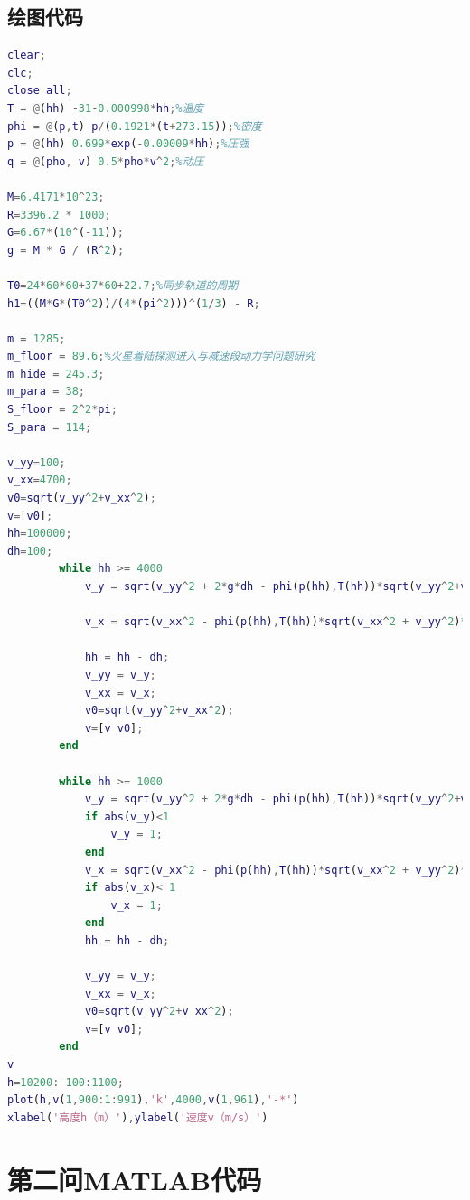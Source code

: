 \documentclass[hyperref,a4paper,UTF8]{ctexart}
\begin{document}
\subsection{绘图代码}
\begin{lstlisting}[language=Matlab]
clear;
clc;
close all;
T = @(hh) -31-0.000998*hh;%温度
phi = @(p,t) p/(0.1921*(t+273.15));%密度
p = @(hh) 0.699*exp(-0.00009*hh);%压强
q = @(pho, v) 0.5*pho*v^2;%动压

M=6.4171*10^23;
R=3396.2 * 1000;
G=6.67*(10^(-11));
g = M * G / (R^2);

T0=24*60*60+37*60+22.7;%同步轨道的周期
h1=((M*G*(T0^2))/(4*(pi^2)))^(1/3) - R;

m = 1285;
m_floor = 89.6;%火星着陆探测进入与减速段动力学问题研究
m_hide = 245.3;
m_para = 38;
S_floor = 2^2*pi;
S_para = 114;

v_yy=100;
v_xx=4700;
v0=sqrt(v_yy^2+v_xx^2);
v=[v0];
hh=100000;
dh=100;
        while hh >= 4000
            v_y = sqrt(v_yy^2 + 2*g*dh - phi(p(hh),T(hh))*sqrt(v_yy^2+v_xx^2)*S_floor*dh*v_yy/m);
            
            v_x = sqrt(v_xx^2 - phi(p(hh),T(hh))*sqrt(v_xx^2 + v_yy^2)*S_floor*dh*v_xx^2 / (m * v_yy));
            
            hh = hh - dh;
            v_yy = v_y;
            v_xx = v_x;
            v0=sqrt(v_yy^2+v_xx^2);
            v=[v v0];
        end

        while hh >= 1000
            v_y = sqrt(v_yy^2 + 2*g*dh - phi(p(hh),T(hh))*sqrt(v_yy^2+v_xx^2)*(S_floor+S_para)*dh*v_yy/m);
            if abs(v_y)<1  
                v_y = 1;
            end
            v_x = sqrt(v_xx^2 - phi(p(hh),T(hh))*sqrt(v_xx^2 + v_yy^2)*(S_floor+S_para)*dh*v_xx^2 / (m * v_yy));
            if abs(v_x)< 1
                v_x = 1;
            end
            hh = hh - dh;
            
            v_yy = v_y;
            v_xx = v_x;
            v0=sqrt(v_yy^2+v_xx^2);
            v=[v v0];
        end
v
h=10200:-100:1100;
plot(h,v(1,900:1:991),'k',4000,v(1,961),'-*')
xlabel('高度h（m）'),ylabel('速度v（m/s）')
\end{lstlisting}
\section{第二问MATLAB代码}
\end{document}
